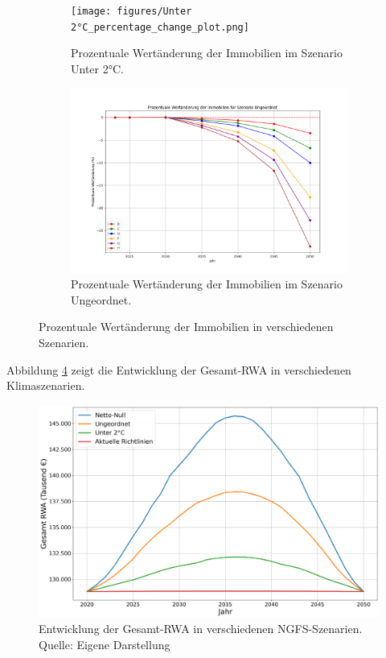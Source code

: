 \begin{figure}[htbp]
    \vspace{1em}
    
    \begin{subfigure}[b]{0.48\textwidth}
        \centering
        \texttt{[image: figures/Unter 2°C\_percentage\_change\_plot.png]}
        \caption{Prozentuale Wertänderung der Immobilien im Szenario Unter 2°C.}
        \label{fig:unter_2c}
    \end{subfigure}
    \hfill
    \begin{subfigure}[b]{0.48\textwidth}
        \centering
        \includegraphics[width=\textwidth]{figures/Ungeordnet_percentage_change_plot.png}
        \caption{Prozentuale Wertänderung der Immobilien im Szenario Ungeordnet.}
        \label{fig:ungeordnet}
    \end{subfigure}
    \caption{Prozentuale Wertänderung der Immobilien in verschiedenen Szenarien.}
    \label{fig:all_scenarios}
\end{figure}

Abbildung \ref{fig:gesamt_rwa_plot} zeigt die Entwicklung der Gesamt-\acs{RWA} in verschiedenen Klimaszenarien.
\begin{figure}[htbp]
    \centering
    \includegraphics[width=\textwidth]{figures/gesamt_rwa_plot.png}
    \caption{Entwicklung der Gesamt-RWA in verschiedenen NGFS-Szenarien. Quelle: Eigene Darstellung}
    \label{fig:gesamt_rwa_plot}
\end{figure}
\FloatBarrier